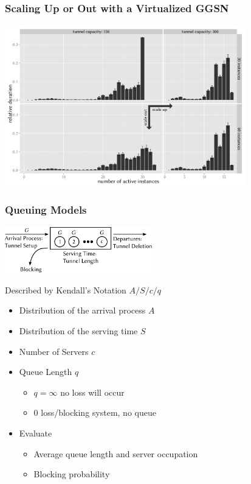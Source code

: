 \documentclass{beamer}
\begin{document}
\begin{frame}
	\frametitle{Scaling Up or Out with a Virtualized GGSN}
	
	\begin{center}
		\includegraphics[height=7cm]{../../chapters/04-mobilenets/images/R-virtualized-instanceuse-barplot.pdf}
	\end{center}
\end{frame}

\begin{frame}
	\frametitle{Queuing Models}

	\begin{center}
		\includegraphics[height=2cm]{../../chapters/04-mobilenets/images/GGn-model.pdf}
	\end{center}

	Described by Kendall's Notation $A/S/c/q$
	\begin{itemize}
	\item Distribution of the arrival process $A$
	\item Distribution of the serving time $S$
	\item Number of Servers $c$
	\item Queue Length $q$
	\begin{itemize}
		\item $q=\infty$ no loss will occur
		\item $0$ loss/blocking system, no queue
	\end{itemize}
	\item Evaluate
		\begin{itemize}
			\item Average queue length and server occupation
			\item Blocking probability
		\end{itemize}
	\end{itemize}
\end{frame}

\setcounter{framenumber}{\value{finalframe}}
\end{document}

